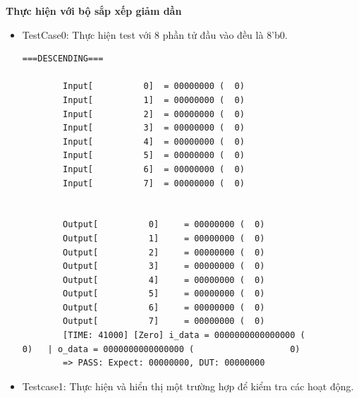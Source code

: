 {\centering\textbf{Thực hiện với bộ sắp xếp giảm dần}}
\begin{itemize}[label=-]
	\item TestCase0: Thực hiện test với 8 phần tử đầu vào đều là \textsf{8'b0}.
%	
%	
	\begin{lstlisting}[style=StyleResult, language=Result, caption={Kết quả khi cho 8 phần tử ngõ vào đều là không.}]
		===DESCENDING===
		
		Input[          0] 	= 00000000 (  0)
		Input[          1] 	= 00000000 (  0)
		Input[          2] 	= 00000000 (  0)
		Input[          3] 	= 00000000 (  0)
		Input[          4] 	= 00000000 (  0)
		Input[          5] 	= 00000000 (  0)
		Input[          6] 	= 00000000 (  0)
		Input[          7] 	= 00000000 (  0)
		
		
		Output[          0] 	= 00000000 (  0)
		Output[          1] 	= 00000000 (  0)
		Output[          2] 	= 00000000 (  0)
		Output[          3] 	= 00000000 (  0)
		Output[          4] 	= 00000000 (  0)
		Output[          5] 	= 00000000 (  0)
		Output[          6] 	= 00000000 (  0)
		Output[          7] 	= 00000000 (  0)
		[TIME: 41000] [Zero] i_data = 0000000000000000 (                   0) 	| o_data = 0000000000000000 (                   0)
		=> PASS: Expect: 00000000, DUT: 00000000 
	\end{lstlisting}
	
	\item Testcase1: Thực hiện và hiển thị một trường hợp để kiểm tra các hoạt động.
	

\end{itemize}
